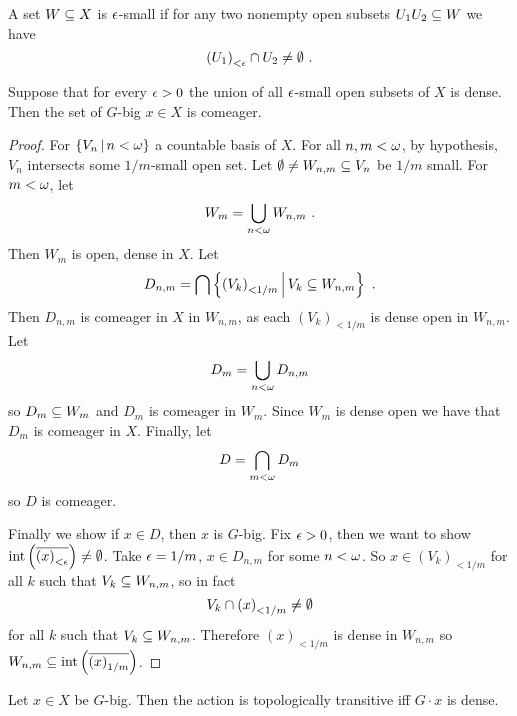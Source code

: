 \documentclass{amsart}
\begin{document}
\begin{defn}
A set $W\subseteq X$ is $\epsilon$-small if for any two nonempty open subsets $U_1 U_2\subseteq W$ we
have
\begin{equation}
\left(U_1\right)_{<\e} \cap U_2 \neq \emp \ .
\end{equation}
\end{defn}

\begin{lem}
Suppose that for every $\epsilon > 0$ the union of all $\epsilon$-small open subsets of $X$ is dense.
Then the set of $G$-big $x\in X$ is comeager.
\end{lem}
\begin{proof}
For $\left\{V_n \, \middle\vert \, n < \omega\right\}$ a countable basis of $X$. For all $n,m<\omega$, by
hypothesis, $V_n$ intersects some $1/m$-small open set.
Let $\emptyset \neq W_{n,m}\subseteq V_n$ be $1/m$ small. 
For $m<\omega$, let
\begin{equation}
W_m = \bigcup_{n< \omega} W_{n,m} \ .
\end{equation}
Then $W_m$ is open, dense in $X$. 
Let 
\begin{equation}
D_{n,m} = \binter\left\{\left(V_k\right)_{<1/m} \st V_k\subeq W_{n,m}\right\} \ .
\end{equation}
Then $D_{n,m}$ is comeager in $X$ in $W_{n,m}$, as each $\left(V_k\right)_{<1/m}$
is dense open in $W_{n,m}$. 
Let
\begin{equation}
D_m = \bigcup_{n<\omega} D_{n,m}
\end{equation}
so $D_m \subseteq W_m$ and $D_m$ is comeager in $W_m$.
Since $W_m$ is dense open we have that $D_m$ is comeager in $X$. 
Finally, let 
\begin{equation}
D = \bigcap_{m<\omega} D_m
\end{equation}
so $D$ is comeager. 

Finally we show 
if $x\in D$, then $x$ is $G$-big. Fix $\epsilon > 0$, then we want to show
$\operatorname{int}\left(\overline{\left(x\right)_{<\epsilon}}\right)\neq \emptyset$.
Take $\epsilon = 1/m$, $x\in D_{n,m}$ for some $n < \omega$. 
So $x\in \left(V_k\right)_{<1/m}$ for all $k$ such that $V_k \subseteq W_{n,m}$, so 
in fact
\begin{equation}
V_k \cap \left(x\right)_{<1/m} \neq \emptyset
\end{equation}
for all $k$ such that $V_k \subseteq W_{n,m}$. 
Therefore $\left(x\right)_{<1/m}$ is dense in $W_{n,m}$ so
$W_{n,m}\subseteq \operatorname{int}\left(\overline{\left(x\right)_{1/m}}\right)$.
\end{proof}

\begin{lem}
Let $x\in X$ be $G$-big. Then the action is topologically transitive iff $G\cdot x$ is
dense. 
\end{lem}
\end{document}
